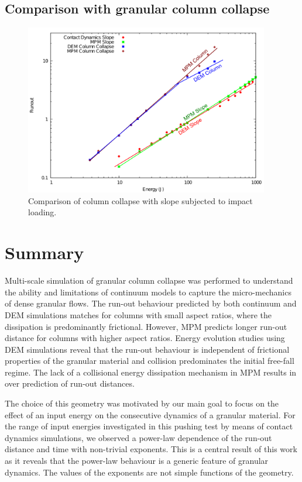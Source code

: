 \subsection{Comparison with granular column collapse}


\begin{figure}[tbhp]
\centering
\includegraphics[width=0.95\textwidth]{Slope_Column}
\caption{Comparison of column collapse with slope subjected to impact loading.}
\label{fig:Slope_Column}
\end{figure}

\section{Summary}
Multi-scale simulation of granular column collapse was performed to understand 
the ability and limitations of continuum models to capture the micro-mechanics 
of dense granular flows. The run-out behaviour predicted by both continuum and 
DEM simulations matches for columns with small aspect ratios, where the 
dissipation is predominantly frictional. However, MPM predicts longer run-out 
distance for columns with higher aspect ratios. Energy evolution studies using 
DEM simulations reveal that the run-out behaviour is independent of frictional 
properties of the granular material and collision predominates the initial 
free-fall regime. The lack of a collisional energy dissipation mechanism in MPM 
results in over prediction of run-out distances. 


The choice of this geometry was motivated by our main goal  to focus on the 
effect of an input energy on the consecutive dynamics of a granular material.
For the range of input energies investigated in this pushing test by means of 
contact dynamics simulations, we observed a power-law dependence of the 
run-out distance and time with non-trivial exponents. This is a central result 
of this work as it reveals that the power-law behaviour is a generic feature of 
granular dynamics. The values of the exponents are not simple functions of 
the geometry. 

